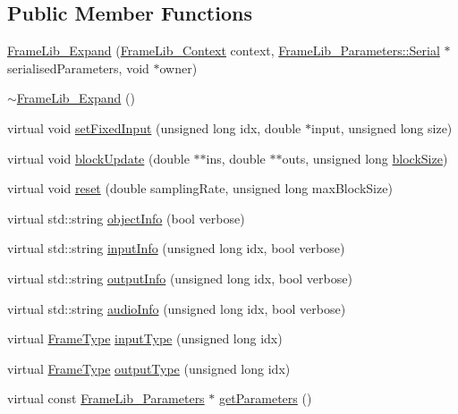 \subsection*{Public Member Functions}
\begin{DoxyCompactItemize}
\item 
\hyperlink{class_frame_lib___expand_a591240aee95c812856a9835b8014a915}{Frame\+Lib\+\_\+\+Expand} (\hyperlink{class_frame_lib___context}{Frame\+Lib\+\_\+\+Context} context, \hyperlink{class_frame_lib___parameters_1_1_serial}{Frame\+Lib\+\_\+\+Parameters\+::\+Serial} $\ast$serialised\+Parameters, void $\ast$owner)
\item 
\hyperlink{class_frame_lib___expand_a3aa2aa689e4b063fa65fe72be311c45f}{$\sim$\+Frame\+Lib\+\_\+\+Expand} ()
\item 
virtual void \hyperlink{class_frame_lib___expand_a73f7bf4264d45f56f249d6303b3e4c35}{set\+Fixed\+Input} (unsigned long idx, double $\ast$input, unsigned long size)
\item 
virtual void \hyperlink{class_frame_lib___expand_ae712d631cb99284e91c3f318534b3c03}{block\+Update} (double $\ast$$\ast$ins, double $\ast$$\ast$outs, unsigned long \hyperlink{_frame_lib___memory_8cpp_a8ef7d53a4cac28bf580a61f265fcaaa6}{block\+Size})
\item 
virtual void \hyperlink{class_frame_lib___expand_a579f16ec32e05ff84ee766038012fc3f}{reset} (double sampling\+Rate, unsigned long max\+Block\+Size)
\item 
virtual std\+::string \hyperlink{class_frame_lib___expand_ac4527eab2bfb55a38bd796d95f2a2562}{object\+Info} (bool verbose)
\item 
virtual std\+::string \hyperlink{class_frame_lib___expand_ab9017c7fe8562857609fcf819b7d1cdd}{input\+Info} (unsigned long idx, bool verbose)
\item 
virtual std\+::string \hyperlink{class_frame_lib___expand_abba12bed97c0b76095f1e1a699591b3e}{output\+Info} (unsigned long idx, bool verbose)
\item 
virtual std\+::string \hyperlink{class_frame_lib___expand_a94ab97ff114452551719fad428fd2d6e}{audio\+Info} (unsigned long idx, bool verbose)
\item 
virtual \hyperlink{_frame_lib___types_8h_ad495a9f61af7fff07d7e97979d1ab854}{Frame\+Type} \hyperlink{class_frame_lib___expand_af7de1e520ecd39d62290278235f8ff45}{input\+Type} (unsigned long idx)
\item 
virtual \hyperlink{_frame_lib___types_8h_ad495a9f61af7fff07d7e97979d1ab854}{Frame\+Type} \hyperlink{class_frame_lib___expand_a926ee7c8b222e018cae92ffbdecb1270}{output\+Type} (unsigned long idx)
\item 
virtual const \hyperlink{class_frame_lib___parameters}{Frame\+Lib\+\_\+\+Parameters} $\ast$ \hyperlink{class_frame_lib___expand_a89b4ff711b3b2772ee3ac7a6774261fb}{get\+Parameters} ()
\end{DoxyCompactItemize}
